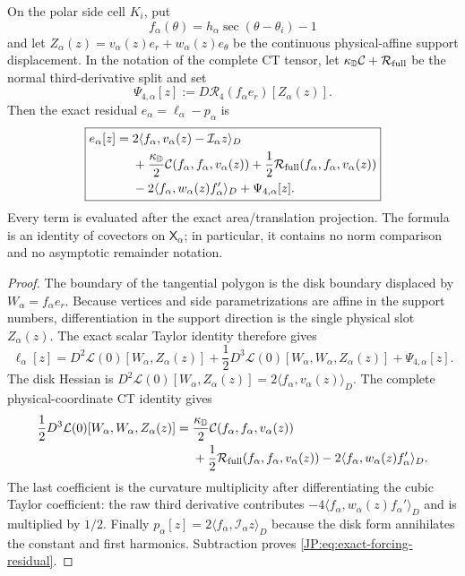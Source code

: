 \begin{proposition}
\label{JP:prop:forcing-residual-split}
On the polar side cell $K_i$, put
\[
 f_\alpha(\theta)=h_\alpha\sec(\theta-\theta_i)-1
\]
and let
$Z_\alpha(z)=v_\alpha(z)e_r+w_\alpha(z)e_\theta$ be the continuous
physical-affine support displacement.  In the notation of the complete CT
tensor, let $\kappa_{\mathbb D}\mathcal C+\mathcal R_{\rm full}$ be the
normal third-derivative split and set
\[
 \Psi_{4,\alpha}[z]
 :=D\mathcal R_4(f_\alpha e_r)[Z_\alpha(z)].
\]
Then the exact residual $e_\alpha=\ell_\alpha-p_\alpha$ is
\begin{equation}\label{JP:eq:exact-forcing-residual}
\boxed{
\begin{aligned}
 e_\alpha[z]={}&
 2\langle f_\alpha,
       v_\alpha(z)-\mathcal I_\alpha z\rangle_D\\
 &+\frac{\kappa_{\mathbb D}}2
   \mathcal C(f_\alpha,f_\alpha,v_\alpha(z))
  +\frac12\mathcal R_{\rm full}
   (f_\alpha,f_\alpha,v_\alpha(z))\\
 &-2\langle f_\alpha,
       w_\alpha(z)f_\alpha'\rangle_D
  +\Psi_{4,\alpha}[z].
\end{aligned}}
\end{equation}
Every term is evaluated after the exact area/translation projection.  The
formula is an identity of covectors on $\mathsf X_\alpha$; in particular,
it contains no norm comparison and no asymptotic remainder notation.
\end{proposition}

\begin{proof}
The boundary of the tangential polygon is the disk boundary displaced by
$W_\alpha=f_\alpha e_r$.  Because vertices and side parametrizations are
affine in the support numbers, differentiation in the support direction is
the single physical slot $Z_\alpha(z)$.  The exact scalar Taylor identity
therefore gives
\[
 \ell_\alpha[z]
 =D^2\mathcal L(0)[W_\alpha,Z_\alpha(z)]
 +\frac12D^3\mathcal L(0)
       [W_\alpha,W_\alpha,Z_\alpha(z)]
 +\Psi_{4,\alpha}[z].
\]
The disk Hessian is
$D^2\mathcal L(0)[W_\alpha,Z_\alpha(z)]
=2\langle f_\alpha,v_\alpha(z)\rangle_D$.
The complete physical-coordinate CT identity gives
\[
\begin{aligned}
 \frac12D^3\mathcal L(0)
 [W_\alpha,W_\alpha,Z_\alpha(z)]
 ={}&\frac{\kappa_{\mathbb D}}2
   \mathcal C(f_\alpha,f_\alpha,v_\alpha(z))\\
 &+\frac12\mathcal R_{\rm full}
   (f_\alpha,f_\alpha,v_\alpha(z))
 -2\langle f_\alpha,w_\alpha(z)f_\alpha'\rangle_D.
\end{aligned}
\]
The last coefficient is the curvature multiplicity after differentiating
the cubic Taylor coefficient: the raw third derivative contributes
$-4\langle f_\alpha,w_\alpha(z)f_\alpha'\rangle_D$ and is multiplied by
$1/2$.  Finally
$p_\alpha[z]=2\langle f_\alpha,\mathcal I_\alpha z\rangle_D$ because the
disk form annihilates the constant and first harmonics.  Subtraction proves
\eqref{JP:eq:exact-forcing-residual}.
\end{proof}

